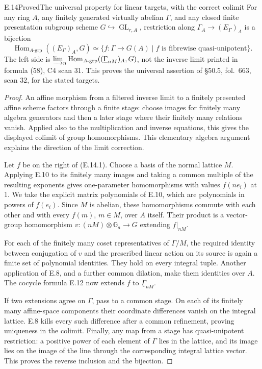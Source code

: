 \begin{statement}{E.14}{Proved}{The universal property for linear targets, with the correct colimit}
For any ring \(A\), any finitely generated virtually abelian
\(\Gamma\), and any closed finite presentation subgroup scheme
\(G\hookrightarrow\operatorname{GL}_{r,A}\), restriction along
\(\Gamma_A\to(E_\Gamma)_A\) is a bijection
\[
 \operatorname{Hom}_{A\text{-grp}}((E_\Gamma)_A,G)
 \simeq
 \{f:\Gamma\to G(A)\mid f\text{ is fibrewise quasi-unipotent}\}.   \tag{E.14.1}
\]
The left side is
\(\varinjlim_n\operatorname{Hom}_{A\text{-grp}}
((\underline\Gamma_{nM})_A,G)\), not the inverse limit printed in
formula (58), C4 scan 31.  This proves the universal assertion of
\S50.5, fol.~663, scan 32, for the stated targets.
\end{statement}
\begin{proof}
An affine morphism from a filtered inverse limit to a finitely
presented affine scheme factors through a finite stage: choose
images for finitely many algebra generators and then a later
stage where their finitely many relations vanish.  Applied also
to the multiplication and inverse equations, this gives the
displayed colimit of group homomorphisms.  This elementary algebra
argument explains the direction of the limit correction.

Let \(f\) be on the right of (E.14.1).  Choose a basis of the normal
lattice \(M\).  Applying E.10 to its finitely many images and
taking a common multiple of the resulting exponents gives
one-parameter homomorphisms with values \(f(ne_i)\) at 1.
We take the explicit matrix polynomials of E.10, which are
polynomials in powers of \(f(e_i)\).  Since \(M\) is abelian,
these homomorphisms commute with each other and with every
\(f(m)\), \(m\in M\), over \(A\) itself.  Their product is a vector-group homomorphism
\(v:(nM)\otimes\mathbb G_a\to G\) extending \(f|_{nM}\).

For each of the finitely many coset representatives of \(\Gamma/M\),
the required identity between conjugation of \(v\) and the
prescribed linear action on its source is again a finite set of
polynomial identities.  They hold on every integral tuple.
Another application of E.8, and a further common dilation,
make them identities over \(A\).  The cocycle formula E.12 now
extends \(f\) to \(\underline\Gamma_{nM}\).

If two extensions agree on \(\Gamma\), pass to a common stage.
On each of its finitely many affine-space components their
coordinate differences vanish on the integral lattice.  E.8
kills every such difference after a common refinement, proving
uniqueness in the colimit.  Finally, any map from a stage has
quasi-unipotent restriction: a positive power of each element of
\(\Gamma\) lies in the lattice, and its image lies on the image of
the line through the corresponding integral lattice vector.
This proves the reverse inclusion and the bijection.
\end{proof}

